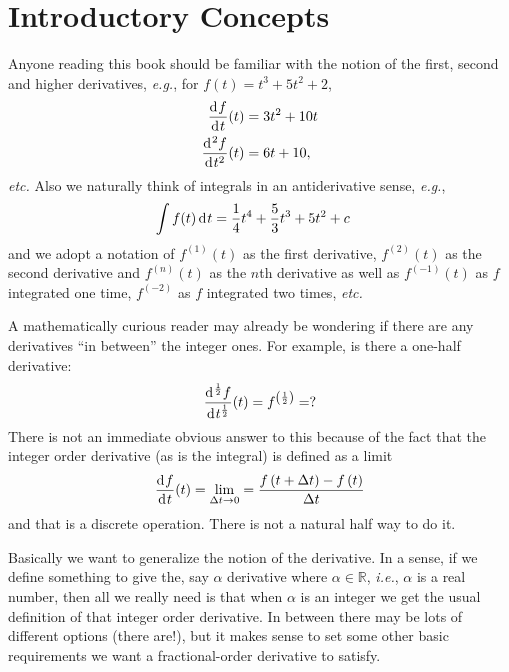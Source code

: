 \section{Introductory Concepts}
Anyone reading this book should be familiar with the notion of the first, second and higher derivatives, \textit{e.g.}, for $f(t) = t^3 + 5 t^2 + 2$, 
\begin{align}
  \frac{\operatorname{d}\hspace*{-1pt} f}{\operatorname{d}\hspace*{-1pt} t}(t) &= 3 t^2 + 10 t \\
  \frac{\operatorname{d}\hspace*{-1pt}^2 f}{\operatorname{d}\hspace*{-1pt} t^2}(t) &= 6t + 10, 
  \label{eq:derivs}
\end{align}
\textit{etc.} Also we naturally think of integrals in an antiderivative sense, \textit{e.g.},
\begin{align}
  \int f(t) \operatorname{d}\hspace*{-1pt} t &= \frac{1}{4} t^4 + \frac{5}{3} t^3 + 5 t^2 + c 
  \label{eq:integrals}
\end{align}
and we adopt a notation of $f^{(1)}(t)$ as the first derivative, $f^{(2)}(t)$ as the second derivative and $f^{(n)}(t)$ as the $n$th derivative as well as $f^{(-1)}(t)$ as $f$ integrated one time, $f^{(-2)}$ as $f$ integrated two times, \textit{etc.}

A mathematically curious reader may already be wondering if there are any derivatives ``in between'' the integer ones.
For example, is there a one-half derivative:
\begin{equation}
  \frac{\operatorname{d}\hspace*{-1pt}^\frac{1}{2} f}{\operatorname{d}\hspace*{-1pt} t^\frac{1}{2}}(t) = f^{\left(\frac{1}{2}\right)} = ?
  \label{eq:halfderiv}
\end{equation}
There is not an immediate obvious answer to this because of the fact that the integer order derivative (as is the integral) is defined as a limit
\begin{equation}
  \frac{\operatorname{d}\hspace*{-1pt} f}{\operatorname{d}\hspace*{-1pt} t}(t) = \lim_{\Delta t \rightarrow 0} = \frac{f\left(t + \Delta t \right) - f\left(t\right)}{\Delta t}
  \label{eq:limdef}
\end{equation}
and that is a discrete operation. There is not a natural half way to do it.

Basically we want to generalize the notion of the derivative. In a sense, if we define something to give the, say $\alpha$ derivative where $\alpha \in \mathbb R$, \textit{i.e.}, $\alpha$ is a real number, then all we really need is that when $\alpha$ is an integer we get the usual definition of that integer order derivative. In between there may be lots of different options (there are!), but it makes sense to set some other basic requirements we want a fractional-order derivative to satisfy.

